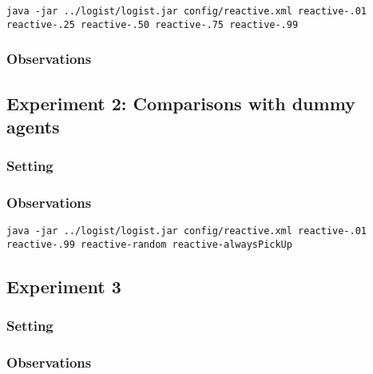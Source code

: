 \documentclass[11pt]{article}
\begin{document}
\begin{verbatim}
java -jar ../logist/logist.jar config/reactive.xml reactive-.01 reactive-.25 reactive-.50 reactive-.75 reactive-.99
\end{verbatim}

\subsubsection{Observations}

\subsection{Experiment 2: Comparisons with dummy agents}

\subsubsection{Setting}

\subsubsection{Observations}

\begin{verbatim}
java -jar ../logist/logist.jar config/reactive.xml reactive-.01 reactive-.99 reactive-random reactive-alwaysPickUp
\end{verbatim}

\subsection{Experiment 3}

\subsubsection{Setting}



\subsubsection{Observations}
\end{document}
